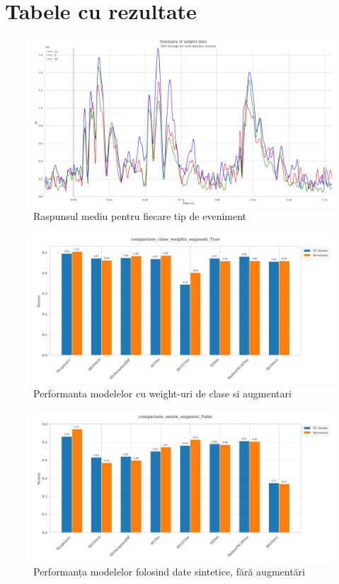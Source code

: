 \chapter{Tabele cu rezultate}

\begin{figure}
    \centering
    \includegraphics[width=1\linewidth]{images/average_response_each_erp.png}
    \caption{Raspunsul mediu pentru fiecare tip de eveniment}
    \label{fig:average_response_by_event}
\end{figure}

\begin{figure}[h]
    \centering
    \includegraphics[width=1\linewidth]{images/comparison_class_weights_augment_True.png}
    \caption{Performanta modelelor cu weight-uri de clase si augmentari}
    \label{fig:performance_class_weights_augment_true}
\end{figure}

\begin{figure}
    \centering
    \includegraphics[width=1\linewidth]{images/comparison_smote_augment_False.png}
    \caption{Performanța modelelor folosind date sintetice, fără augmentări}
    \label{fig:smote_augment_false}
\end{figure}


